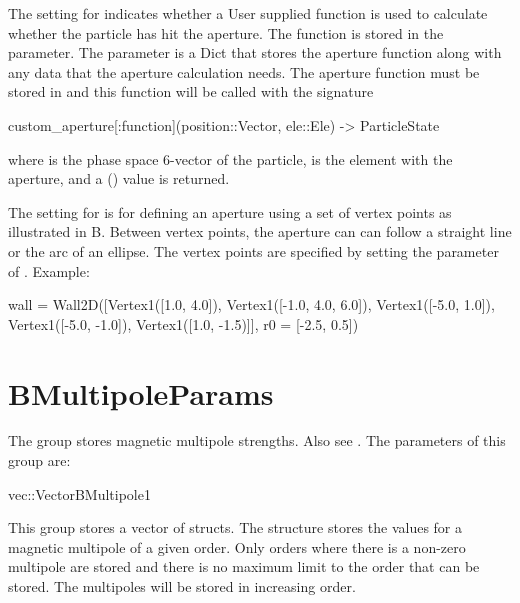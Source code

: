 The  setting for  indicates whether a User supplied function
is used to calculate whether the particle has hit the aperture. The function is stored
in the  parameter. The  parameter is a Dict that stores
the aperture function along with any data that the aperture calculation needs. The aperture
function must be stored in  and this function will be
called with the signature
\begin{example} %
  custom_aperture[:function](position::Vector, ele::Ele) -> ParticleState
\end{example}
where  is the phase space 6-vector of the particle,  is the element 
with the aperture, and a  () value is returned.

The  setting for  is for defining an aperture using a 
set of vertex points as illustrated in B. Between vertex points, the aperture
can can follow a straight line or the arc of an ellipse. The vertex points are specified by
setting the  parameter of . Example:
\begin{example}
  wall = Wall2D([Vertex1([1.0, 4.0]), Vertex1([-1.0, 4.0, 6.0]), 
                 Vertex1([-5.0, 1.0]), Vertex1([-5.0, -1.0]), 
                 Vertex1([1.0, -1.5)]], r0 = [-2.5, 0.5]) 
\end{example}

\section{BMultipoleParams}
\label{s:bmultipole.g}

The  group stores magnetic multipole strengths. Also see .
The parameters of this group are:
\begin{example}
  vec::Vector{BMultipole1}
\end{example}
This group stores a vector of  structs.
The  structure stores the values for a magnetic multipole of a given order.
Only orders where there is a non-zero multipole are stored and there is no maximum limit to the 
order that can be stored. The multipoles will be stored in increasing order.

